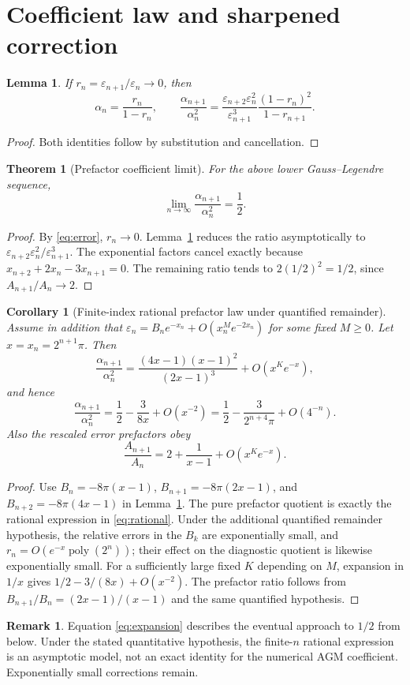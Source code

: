 \documentclass[11pt]{article}
\newtheorem{theorem}{Theorem}
\newtheorem{lemma}{Lemma}
\newtheorem{corollary}{Corollary}
\theoremstyle{definition}\newtheorem{remark}{Remark}\newtheorem{observation}{Numerical Observation}
\begin{document}
\section{Coefficient law and sharpened correction}
\begin{lemma}\label{lem:ratios}
If $r_n=\varepsilon_{n+1}/\varepsilon_n\to0$, then
\[
\alpha_n=\frac{r_n}{1-r_n},\qquad
\frac{\alpha_{n+1}}{\alpha_n^2}=
\frac{\varepsilon_{n+2}\varepsilon_n^2}{\varepsilon_{n+1}^3}
\frac{(1-r_n)^2}{1-r_{n+1}}.
\]
\end{lemma}
\begin{proof}Both identities follow by substitution and cancellation.\end{proof}
\begin{theorem}[Prefactor coefficient limit]\label{thm:limit}
For the above lower Gauss--Legendre sequence,
\[\lim_{n\to\infty}\frac{\alpha_{n+1}}{\alpha_n^2}=\frac12.\]
\end{theorem}
\begin{proof}
By \eqref{eq:error}, $r_n\to0$. Lemma~\ref{lem:ratios} reduces the ratio asymptotically to $\varepsilon_{n+2}\varepsilon_n^2/\varepsilon_{n+1}^3$. The exponential factors cancel exactly because $x_{n+2}+2x_n-3x_{n+1}=0$. The remaining ratio tends to $2(1/2)^2=1/2$, since $A_{n+1}/A_n\to2$.
\end{proof}
\begin{corollary}[Finite-index rational prefactor law under quantified remainder]\label{cor:sharp}
Assume in addition that $\varepsilon_n=B_ne^{-x_n}+O(x_n^M e^{-2x_n})$ for some fixed $M\geq0$. Let $x=x_n=2^{n+1}\pi$. Then
\begin{equation}\label{eq:rational}
\frac{\alpha_{n+1}}{\alpha_n^2}
=\frac{(4x-1)(x-1)^2}{(2x-1)^3}
+O(x^K e^{-x}),
\end{equation}
and hence
\begin{equation}\label{eq:expansion}
\frac{\alpha_{n+1}}{\alpha_n^2}
=\frac12-\frac{3}{8x}+O(x^{-2})
=\frac12-\frac{3}{2^{n+4}\pi}+O(4^{-n}).
\end{equation}
Also the rescaled error prefactors obey
\[
\frac{A_{n+1}}{A_n}=2+\frac1{x-1}+O(x^K e^{-x}).
\]
\end{corollary}
\begin{proof}
Use $B_n=-8\pi(x-1)$, $B_{n+1}=-8\pi(2x-1)$, and $B_{n+2}=-8\pi(4x-1)$ in Lemma~\ref{lem:ratios}. The pure prefactor quotient is exactly the rational expression in \eqref{eq:rational}. Under the additional quantified remainder hypothesis, the relative errors in the $B_k$ are exponentially small, and $r_n=O(e^{-x}\operatorname{poly}(2^n))$; their effect on the diagnostic quotient is likewise exponentially small. For a sufficiently large fixed $K$ depending on $M$, expansion in $1/x$ gives $1/2-3/(8x)+O(x^{-2})$. The prefactor ratio follows from $B_{n+1}/B_n=(2x-1)/(x-1)$ and the same quantified hypothesis.
\end{proof}
\begin{remark}
Equation \eqref{eq:expansion} describes the eventual approach to $1/2$ from below. Under the stated quantitative hypothesis, the finite-$n$ rational expression is an asymptotic model, not an exact identity for the numerical AGM coefficient. Exponentially small corrections remain.
\end{remark}
\end{document}
